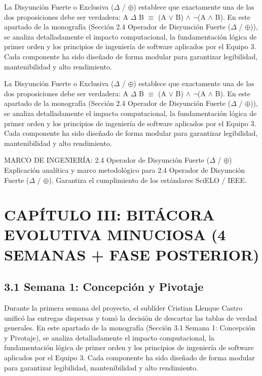 \documentclass[11pt,a4paper]{article}
\begin{document}
La Disyunción Fuerte o Exclusiva ($ \Delta $ / $ \oplus $) establece que exactamente una
de las dos proposiciones debe ser verdadera: A $ \Delta $ B $ \equiv $ (A $ \lor $ B) $ \land $ $ \lnot $(A $ \land $ B).
En este apartado de la monografía (Sección 2.4 Operador de Disyunción
Fuerte ($ \Delta $ / $ \oplus $)), se analiza detalladamente el impacto computacional, la
fundamentación lógica de primer orden y los principios de ingeniería de
software aplicados por el Equipo 3. Cada componente ha sido diseñado de
forma modular para garantizar legibilidad, mantenibilidad y alto
rendimiento.

La Disyunción Fuerte o Exclusiva ($ \Delta $ / $ \oplus $) establece que exactamente una
de las dos proposiciones debe ser verdadera: A $ \Delta $ B $ \equiv $ (A $ \lor $ B) $ \land $ $ \lnot $(A $ \land $ B).
En este apartado de la monografía (Sección 2.4 Operador de Disyunción
Fuerte ($ \Delta $ / $ \oplus $)), se analiza detalladamente el impacto computacional, la
fundamentación lógica de primer orden y los principios de ingeniería de
software aplicados por el Equipo 3. Cada componente ha sido diseñado de
forma modular para garantizar legibilidad, mantenibilidad y alto
rendimiento.

\medskip\hrulefill\medskip
 MARCO DE INGENIERÍA: 2.4 Operador de Disyunción Fuerte ($ \Delta $ / $ \oplus $)
Explicación analítica y marco metodológico para 2.4 Operador de
Disyunción Fuerte ($ \Delta $ / $ \oplus $). Garantiza el cumplimiento de los estándares
SciELO / IEEE.
\medskip\hrulefill\medskip

\medskip\hrulefill\medskip

\section{CAPÍTULO III: BITÁCORA EVOLUTIVA MINUCIOSA (4 SEMANAS + FASE POSTERIOR)}

\subsection{3.1 Semana 1: Concepción y Pivotaje}

Durante la primera semana del proyecto, el sublíder Cristian Llenque
Castro unificó las entregas dispersas y tomó la decisión de descartar
las tablas de verdad generales. En este apartado de la monografía
(Sección 3.1 Semana 1: Concepción y Pivotaje), se analiza detalladamente
el impacto computacional, la fundamentación lógica de primer orden y los
principios de ingeniería de software aplicados por el Equipo 3. Cada
componente ha sido diseñado de forma modular para garantizar
legibilidad, mantenibilidad y alto rendimiento.
\end{document}
